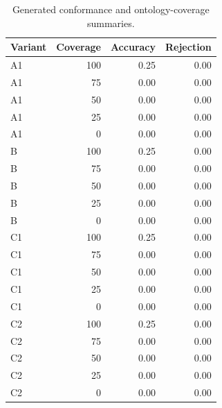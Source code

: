 \begin{table}[t]\centering\scriptsize\caption{Generated conformance and ontology-coverage summaries.}\begin{tabular}{lrrr}\toprule Variant & Coverage & Accuracy & Rejection\\\midrule
A1 & 100 & 0.25 & 0.00\\
A1 & 75 & 0.00 & 0.00\\
A1 & 50 & 0.00 & 0.00\\
A1 & 25 & 0.00 & 0.00\\
A1 & 0 & 0.00 & 0.00\\
B & 100 & 0.25 & 0.00\\
B & 75 & 0.00 & 0.00\\
B & 50 & 0.00 & 0.00\\
B & 25 & 0.00 & 0.00\\
B & 0 & 0.00 & 0.00\\
C1 & 100 & 0.25 & 0.00\\
C1 & 75 & 0.00 & 0.00\\
C1 & 50 & 0.00 & 0.00\\
C1 & 25 & 0.00 & 0.00\\
C1 & 0 & 0.00 & 0.00\\
C2 & 100 & 0.25 & 0.00\\
C2 & 75 & 0.00 & 0.00\\
C2 & 50 & 0.00 & 0.00\\
C2 & 25 & 0.00 & 0.00\\
C2 & 0 & 0.00 & 0.00\\\bottomrule\end{tabular}\end{table}
